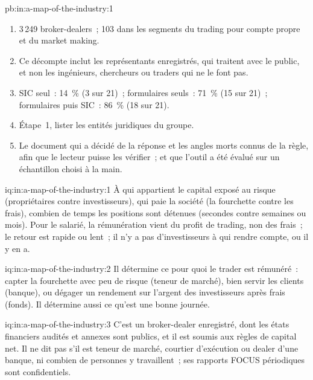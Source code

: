 \begin{solution}{pb:in:a-map-of-the-industry:1}
\begin{enumerate}
société de gestion (toutes deux sous le SIC 6211, lues comme des dealers).
\item 3\,249 broker-dealers~; 103 dans les segments du trading pour compte propre et du market making.
\item Ce décompte inclut les représentants enregistrés, qui traitent avec le public, et non les ingénieurs, chercheurs ou traders qui ne le font pas.
\item SIC seul~: 14~\% (3 sur 21)~; formulaires seuls~: 71~\% (15 sur 21)~; formulaires puis SIC~: 86~\% (18 sur 21).
\item Étape~1, lister les entités juridiques du groupe.
\item Le document qui a décidé de la réponse et les angles morts connus de la règle, afin que le lecteur puisse les vérifier~; et que
l'outil a été évalué sur un échantillon choisi à la main.
\end{enumerate}
\end{solution}

\begin{solution}{iq:in:a-map-of-the-industry:1}
À qui appartient le capital exposé au risque (propriétaires contre investisseurs), qui paie la société (la fourchette contre les frais), combien de temps les positions
sont détenues (secondes contre semaines ou mois). Pour le salarié, la rémunération vient du profit de trading, non des frais~; le retour est rapide
ou lent~; il n'y a pas d'investisseurs à qui rendre compte, ou il y en a.
\end{solution}

\begin{solution}{iq:in:a-map-of-the-industry:2}
Il détermine ce pour quoi le trader est rémunéré~: capter la fourchette avec peu de risque (teneur de marché), bien servir les clients (banque),
ou dégager un rendement sur l'argent des investisseurs après frais (fonds). Il détermine aussi ce qu'est une bonne journée.
\end{solution}

\begin{solution}{iq:in:a-map-of-the-industry:3}
C'est un broker-dealer enregistré, dont les états financiers audités et annexes sont publics, et il est soumis
aux règles de capital net. Il ne dit pas s'il est teneur de marché, courtier d'exécution ou dealer d'une banque, ni combien
de personnes y travaillent~; ses rapports FOCUS périodiques sont confidentiels.
\end{solution}

